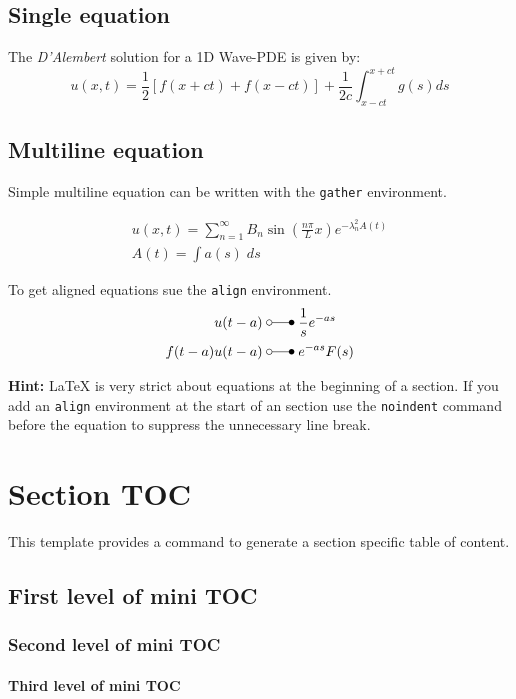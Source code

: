 \documentclass[\fontheight]{extarticle}
\begin{document}
\begin{multicols*}{3}
    \subsection{Single equation}
    The \textit{D'Alembert} solution for a 1D Wave-PDE is given by:
    \begin{equation*}
        u(x,t)=\frac{1}{2}\left[f(x+ct)+f(x-ct)\right]+\frac{1}{2c}\int_{x-ct}^{x+ct}g(s)ds
    \end{equation*}

    \subsection{Multiline equation}
    Simple multiline equation can be written with the \texttt{gather} environment.

    \begin{gather*}
        u(x,t) =\sum_{n=1}^\infty B_n\sin(\frac{n\pi}Lx)e^{-\lambda_n^2 A(t)} \\
        A(t)=\int a(s)\;ds
    \end{gather*}

    To get aligned equations sue the \texttt{align} environment.
    \begin{align*}
        u(t-a)       \; & \laplace\; \frac{1}{s}e^{-as} \\
        f(t-a)u(t-a) \; & \laplace\; e^{-as}F(s)
    \end{align*}

    \textbf{Hint:} \LaTeX{} is very strict about equations at the beginning of a section.
    If you add an \texttt{align} environment at the start of an section use the
    \texttt{noindent} command before the equation to suppress the unnecessary
    line break.

    \section{Section TOC}
    This template provides a command to generate a section specific table of content.
    \createsectiontoc{}

    \subsection{First level of mini TOC}
    \subsubsection{Second level of mini TOC}
    \paragraph{Third level of mini TOC}


\end{multicols*}
\end{document}
